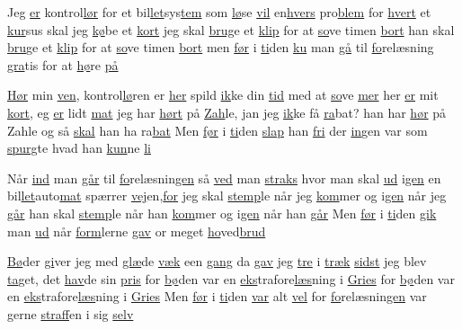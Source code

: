 \documentclass[a4paper,11pt]{article}
\begin{document}
\begin{song}
%
Jeg \underline{er} kontrol\underline{lør} for et bil\underline{let}sys\underline{tem}
som \underline{lø}se \underline{vil} en\underline{hvers} pro\underline{blem}
%
for \underline{hvert} et \underline{kur}sus skal jeg \underline{kø}be et \underline{kort}
jeg skal \underline{brug}e et \underline{klip} for at \underline{so}ve timen \underline{bort}
 han skal \underline{bru}ge et \underline{klip} for at \underline{so}ve timen \underline{bort}
%
men \underline{før} i \underline{ti}den \underline{ku} man \underline{gå}
til \underline{fo}relæsning \underline{gra}tis for at \underline{hø}re \underline{på}
 

%
\underline{Hør} min \underline{ven}, kontrol\underline{lø}ren er \underline{her}
spild \underline{ik}ke din \underline{tid} med at \underline{so}ve \underline{mer}
%
her \underline{er} mit \underline{kort}, eg \underline{er} lidt \underline{mat}
jeg har \underline{hørt} på \underline{Zah}le, jan jeg \underline{ik}ke få \underline{ra}bat?
 han har \underline{hør} på Zahle og så \underline{skal} han ha ra\underline{bat}
%
Men \underline{før} i \underline{ti}den \underline{slap} han \underline{fri}
der \underline{in}gen var som \underline{spurg}te hvad han \underline{kun}ne \underline{li}
 

%
Når \underline{ind} man \underline{går} til \underline{fo}relæsnin\underline{gen}
så \underline{ved} man \underline{straks} hvor man skal \underline{ud} i\underline{gen}
%
en bil\underline{let}auto\underline{mat} spærrer \underline{vej}en,\underline{for}
jeg skal \underline{stemp}le når jeg \underline{kom}mer og i\underline{gen} når jeg \underline{går}
 han skal \underline{stemp}le når han \underline{kom}mer og i\underline{gen} når han \underline{går}
%
Men \underline{før} i \underline{ti}den \underline{gik} man \underline{ud}
når \underline{form}lerne \underline{gav} or meget \underline{ho}ved\underline{brud}
 

%
\underline{Bø}der \underline{gi}ver jeg med \underline{glæ}de \underline{væk}
een \underline{gang} da \underline{gav} jeg \underline{tre} i \underline{træk}
%
\underline{sidst} jeg blev \underline{ta}get, det \underline{hav}de sin \underline{pris}
for \underline{bø}den var en \underline{eks}trafore\underline{læs}ning i \underline{Gries}
 for \underline{bø}den var en \underline{eks}trafore\underline{læs}ning i \underline{Gries}
%
Men \underline{før} i \underline{ti}den \underline{var} alt \underline{vel}
for \underline{fo}relæsnin\underline{gen} var gerne \underline{straf}fen i sig \underline{selv}
 


\end{song}
\end{document}
